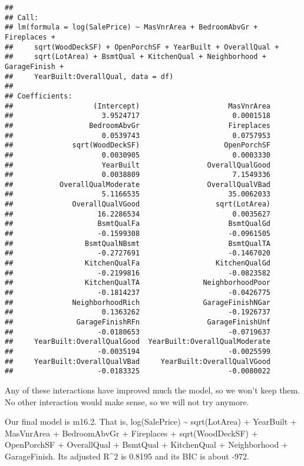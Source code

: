 \documentclass[
]{article}
\begin{document}
\begin{verbatim}
## 
## Call:
## lm(formula = log(SalePrice) ~ MasVnrArea + BedroomAbvGr + Fireplaces + 
##     sqrt(WoodDeckSF) + OpenPorchSF + YearBuilt + OverallQual + 
##     sqrt(LotArea) + BsmtQual + KitchenQual + Neighborhood + GarageFinish + 
##     YearBuilt:OverallQual, data = df)
## 
## Coefficients:
##                   (Intercept)                     MasVnrArea  
##                     3.9524717                      0.0001518  
##                  BedroomAbvGr                     Fireplaces  
##                     0.0539743                      0.0757953  
##              sqrt(WoodDeckSF)                    OpenPorchSF  
##                     0.0030905                      0.0003330  
##                     YearBuilt                OverallQualGood  
##                     0.0038809                      7.1549336  
##           OverallQualModerate                OverallQualVBad  
##                     5.1166535                     35.0062033  
##              OverallQualVGood                  sqrt(LotArea)  
##                    16.2286534                      0.0035627  
##                    BsmtQualFa                     BsmtQualGd  
##                    -0.1599308                     -0.0961505  
##                 BsmtQualNBsmt                     BsmtQualTA  
##                    -0.2727691                     -0.1467020  
##                 KitchenQualFa                  KitchenQualGd  
##                    -0.2199816                     -0.0823582  
##                 KitchenQualTA               NeighborhoodPoor  
##                    -0.1814237                     -0.0426775  
##              NeighborhoodRich               GarageFinishNGar  
##                     0.1363262                     -0.1926737  
##               GarageFinishRFn                GarageFinishUnf  
##                    -0.0180653                     -0.0719637  
##     YearBuilt:OverallQualGood  YearBuilt:OverallQualModerate  
##                    -0.0035194                     -0.0025599  
##     YearBuilt:OverallQualVBad     YearBuilt:OverallQualVGood  
##                    -0.0183325                     -0.0080022
\end{verbatim}

Any of these interactions have improved much the model, so we won't keep
them. No other interaction would make sense, so we will not try anymore.

Our final model is m16.2. That is, log(SalePrice) \textasciitilde{}
sqrt(LotArea) + YearBuilt + MasVnrArea + BedroomAbvGr + Fireplaces +
sqrt(WoodDeckSF) + OpenPorchSF + OverallQual + BsmtQual + KitchenQual +
Neighborhood + GarageFinish. Its adjusted R\^{}2 is 0.8195 and its BIC
is about -972.
\end{document}

